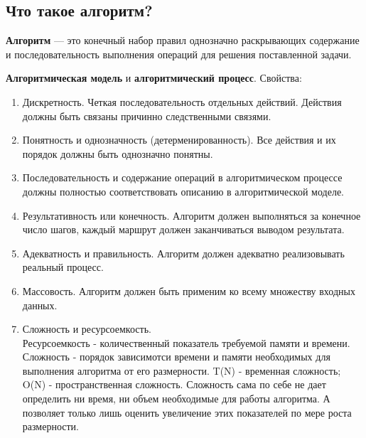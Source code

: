 \subsection{Что такое алгоритм?}
\textbf{Алгоритм} --- это конечный набор правил однозначно раскрывающих
содержание и последовательность выполнения операций для решения поставленной
задачи.\par
\textbf{Алгоритмическая модель} и \textbf{алгоритмический процесс}. Свойства:
\begin{enumerate}
  \item Дискретность. Четкая последовательность отдельных действий. Действия
    должны быть связаны причинно следственными связями.
  \item Понятность и однозначность (детерменированность). Все действия и их
    порядок должны быть однозначно понятны.
  \item Последовательность и содержание операций в алгоритмическом процессе
    должны полностью соответствовать описанию в алгоритмической моделе.
  \item Результативность или конечность. Алгоритм должен выполняться за конечное
    число шагов, каждый маршрут должен заканчиваться выводом результата.
  \item Адекватность и правильность. Алгоритм должен адекватно реализовывать
    реальный процесс.
  \item Массовость. Алгоритм должен быть применим ко всему множеству входных
    данных.
  \item Сложность и ресурсоемкость.\\
    {\ttfamily Ресурсоемкость - количественный показатель требуемой памяти и
    времени. Сложность - порядок зависимотси времени и памяти необходимых для
    выполнения алгоритма от его размерности. T(N) - временная сложность; O(N) -
    пространственная сложность. Сложность сама по себе не дает определить ни
    время, ни объем необходимые для работы алгоритма. А позволяет только лишь
    оценить увеличение этих показателей по мере роста размерности.}
\end{enumerate}

